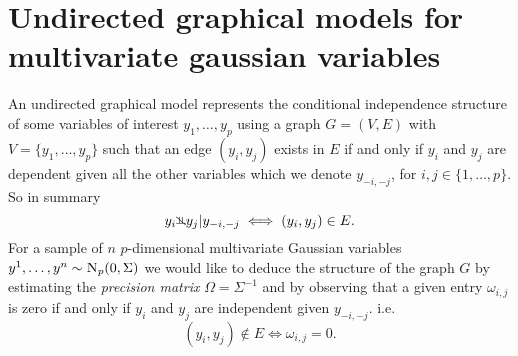 \documentclass{scrartcl}
\newcommand{\1}{\mathds{1}}
\newcommand{\inv}{^{-1}}
\newcommand{\Np}{\textsc{N}_p}
\newcommand{\nindep}{{\rotatebox[origin=c]{90}{$\nvDash$}}}
\begin{document}
\section{Undirected graphical models for multivariate gaussian
  variables}\label{sect:graphs}
An undirected graphical model represents the conditional independence
structure of some variables of interest $y_1, \dots, y_p$ using a
graph $G=(V, E)$ with $V = \{y_1, \dots, y_p\}$ such that an edge $(y_i, y_j)$
exists in $E$ if and only if $y_i$ and $y_j$ are dependent given all the other
variables which we denote $y_{-i, -j}$, for $i,j \in \{1,\dots,p\}.$ So in summary
\[y_i \nindep y_j | y_{-i,-j} \iff (y_i, y_j) \in E.\]
For a sample
of $n$ $p$-dimensional multivariate Gaussian variables $y^1, \dots, y^n \sim
	\Np(0, \Sigma)$ we would like to deduce the structure of the graph $G$ by
estimating the \emph{precision matrix} $\Omega =
	\Sigma\inv$ and by observing that a given entry $\omega_{i,j}$ is zero if and only if $y_i$ and $y_j$ are
independent given $y_{-i,-j}$. i.e.\
\[(y_i, y_j) \notin E \iff \omega_{i,j} = 0.\]
\end{document}
